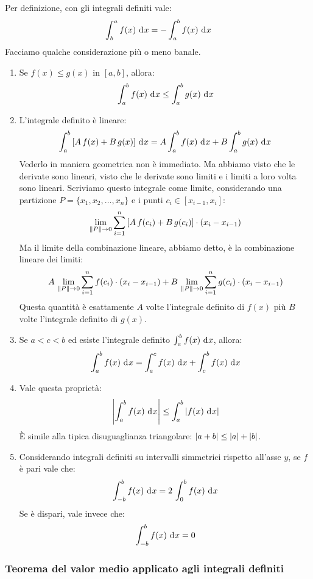 Per definizione, con gli integrali definiti vale:
\[
\int_{b}^{a} f(x) \dx = - \int_{a}^{b} f(x) \dx
\]
Facciamo qualche considerazione pi\`u o meno banale.
\begin{enumerate}
    \item Se $f(x) \le g(x)$ in $[a,b]$, allora:
    \[
    \int_{a}^{b} f(x) \dx \le \int_{a}^{b} g(x) \dx
    \]
    \item L'integrale definito \`e lineare:
    \[
    \int_{a}^{b} \left[ A \, f(x) + B \, g(x) \right] \dx =
    A \int_{a}^{b} f(x) \dx + B \int_{a}^{b} g(x) \dx
    \]
    Vederlo in maniera geometrica non \`e immediato. Ma abbiamo visto che le derivate sono lineari, visto che le derivate sono limiti e i limiti a loro volta sono lineari. Scriviamo questo integrale come limite, considerando una partizione $P = \{ x_1, x_2, \ldots, x_n \}$ e i punti $c_i \in [x_{i-1}, x_{i}]$:
    \[
    \lim_{\left\lVert{P}\right\rVert \to 0} \sum_{i = 1}^{n} \left[ A \, f(c_i) + B \, g(c_i) \right] \cdot (x_{i} - x_{i-1})
    \]
    Ma il limite della combinazione lineare, abbiamo detto, \`e la combinazione lineare dei limiti:
    \[
    A \, \lim_{\left\lVert{P}\right\rVert \to 0} \sum_{i = 1}^{n} f(c_i) \cdot (x_{i} - x_{i - 1}) +
    B \, \lim_{\left\lVert{P}\right\rVert \to 0} \sum_{i = 1}^{n} g(c_i) \cdot (x_{i} - x_{i - 1})
    \]
    Questa quantit\`a \`e esattamente $A$ volte l'integrale definito di $f(x)$ pi\`u $B$ volte l'integrale definito di $g(x)$.
    \item Se $a < c < b$ ed esiste l'integrale definito $\int_{a}^{b} f(x) \dx$, allora:
    \[
    \int_{a}^{b} f(x) \dx = \int_{a}^{c} f(x) \dx + \int_{c}^{b} f(x) \dx
    \]
    \item Vale questa propriet\`a:
    \[
    \abs{\int_{a}^{b} f(x) \dx} \le \int_{a}^{b} \abs{f(x) \dx}
    \]
    \`E simile alla tipica disuguaglianza triangolare: $\left\lvert{a + b}\right\rvert \le \left\lvert{a}\right\rvert + \left\lvert{b}\right\rvert$.
    \item Considerando integrali definiti su intervalli simmetrici rispetto all'asse $y$, se $f$ \`e pari vale che:
    \[
    \int_{-b}^{b} f(x) \dx = 2 \, \int_{0}^{b} f(x) \dx
    \]
    Se \`e dispari, vale invece che:
    \[
    \int_{-b}^{b} f(x) \dx = 0
    \]
\end{enumerate}

\subsubsection{Teorema del valor medio applicato agli integrali definiti}

